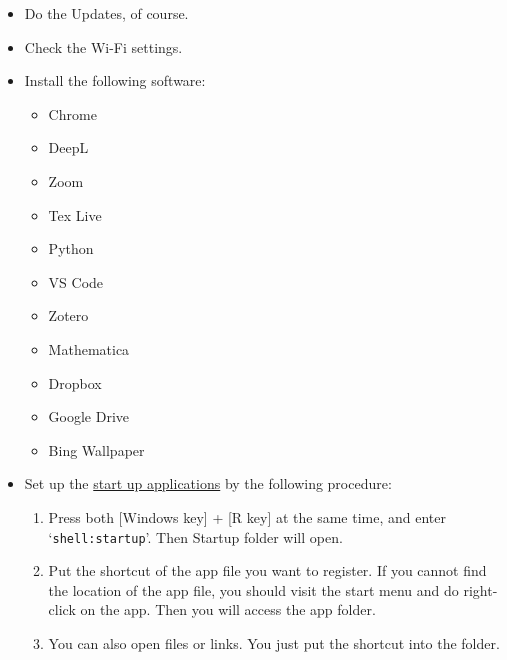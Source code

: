 \documentclass[a4paper,pdftex]{article}
\begin{document}
\begin{itemize}
  \item 
  Do the Updates, of course.

  \item   
  Check the Wi-Fi settings.
  \item 
  Install the following software:
  \begin{itemize}
    \item 
    Chrome
    
    \item 
    DeepL

    \item 
    Zoom

    \item 
    Tex Live
    
    \item 
    Python

    \item 
    VS Code

    \item 
    Zotero

    \item 
    Mathematica

    \item 
    Dropbox

    \item 
    Google Drive

    \item 
    Bing Wallpaper

  \end{itemize}

  \item 
  Set up the \uline{start up applications} by the following procedure:
  \begin{enumerate}
    \item 
    Press both [Windows key] + [R key] at the same time, and enter `\texttt{shell:startup}'. Then Startup folder will open.

    \item 
    Put the shortcut of the app file you want to register. If you cannot find the location of the app file, you should visit the start menu and do right-click on the app. Then you will access the app folder.

    \item 
    You can also open files or links. You just put the shortcut into the folder.

  \end{enumerate}


\end{itemize}
\end{document}
